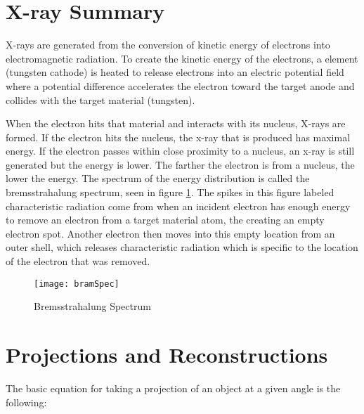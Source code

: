 \section{X-ray Summary}

X-rays are generated from the conversion of kinetic energy of electrons into electromagnetic radiation. To create the kinetic energy of the electrons, a element (tungsten cathode) is heated to release electrons into an electric potential field where a potential difference accelerates the electron toward the target anode and collides with the target material (tungsten).

When the electron hits that material and interacts with its nucleus, X-rays are formed. If the electron hits the nucleus, the x-ray that is produced has maximal energy. If the electron passes within close proximity to a nucleus, an x-ray is still generated but the energy is lower.  The farther the electron is from a nucleus, the lower the energy.  The spectrum of the energy distribution is called the bremsstrahalung spectrum, seen in figure \ref{fig:ct:brem}.  The spikes in this figure labeled characteristic radiation come from when an incident electron has enough energy to remove an electron from a target material atom, the creating an empty electron spot.  Another electron then moves into this empty location from an outer shell, which releases characteristic radiation which is specific to the location of the electron that was removed. 

\begin{figure}[ht]
	\centering
	\texttt{[image: bramSpec]}
	\caption{Bremsstrahalung Spectrum}
	\label{fig:ct:brem}
\end{figure}

\section{Projections and Reconstructions}

The basic equation for taking a projection of an object at a given angle is the following:

